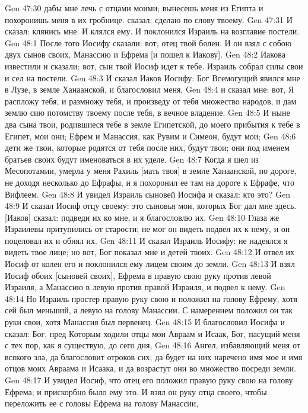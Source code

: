 \vs Gen 47:30 дабы мне лечь с отцами моими; вынесешь меня из Египта и похоронишь меня в их гробнице.  сказал: сделаю по слову твоему.
\vs Gen 47:31 И сказал: клянись мне. И клялся ему. И поклонился Израиль на возглавие постели.
\vs Gen 48:1 После того Иосифу сказали: вот, отец твой болен. И он взял с собою двух сынов своих, Манассию и Ефрема [и пошел к Иакову].
\vs Gen 48:2 Иакова известили и сказали: вот, сын твой Иосиф идет к тебе. Израиль собрал силы свои и сел на постели.
\vs Gen 48:3 И сказал Иаков Иосифу: Бог Всемогущий явился мне в Лузе, в земле Ханаанской, и благословил меня,
\vs Gen 48:4 и сказал мне: вот, Я распложу тебя, и размножу тебя, и произведу от тебя множество народов, и дам землю сию потомству твоему после тебя, в вечное владение.
\vs Gen 48:5 И ныне два сына твои, родившиеся тебе в земле Египетской, до моего прибытия к тебе в Египет, мои они; Ефрем и Манассия, как Рувим и Симеон, будут мои;
\vs Gen 48:6 дети же твои, которые родятся от тебя после них, будут твои; они под именем братьев своих будут именоваться в их уделе.
\vs Gen 48:7 Когда я шел из Месопотамии, умерла у меня Рахиль [мать твоя] в земле Ханаанской, по дороге, не доходя несколько до Ефрафы, и я похоронил ее там на дороге к Ефрафе, что  Вифлеем.
\vs Gen 48:8 И увидел Израиль сыновей Иосифа и сказал: кто это?
\vs Gen 48:9 И сказал Иосиф отцу своему: это сыновья мои, которых Бог дал мне здесь. [Иаков] сказал: подведи их ко мне, и я благословлю их.
\vs Gen 48:10 Глаза же Израилевы притупились от старости; не мог он видеть  подвел их к нему, и он поцеловал их и обнял их.
\vs Gen 48:11 И сказал Израиль Иосифу: не надеялся я видеть твое лице; но вот, Бог показал мне и детей твоих.
\vs Gen 48:12 И отвел их Иосиф от колен его и поклонился ему лицем своим до земли.
\vs Gen 48:13 И взял Иосиф обоих [сыновей своих], Ефрема в правую свою руку против левой Израиля, а Манассию в левую против правой Израиля, и подвел к нему.
\vs Gen 48:14 Но Израиль простер правую руку свою и положил на голову Ефрему, хотя сей был меньший, а левую на голову Манассии. С намерением положил он так руки свои, хотя Манассия был первенец.
\vs Gen 48:15 И благословил Иосифа и сказал: Бог, пред Которым ходили отцы мои Авраам и Исаак, Бог, пасущий меня с тех пор, как я существую, до сего дня,
\vs Gen 48:16 Ангел, избавляющий меня от всякого зла, да благословит отроков сих; да будет на них наречено имя мое и имя отцов моих Авраама и Исаака, и да возрастут они во множество посреди земли.
\vs Gen 48:17 И увидел Иосиф, что отец его положил правую руку свою на голову Ефрема; и прискорбно было ему это. И взял он руку отца своего, чтобы переложить ее с головы Ефрема на голову Манассии,
